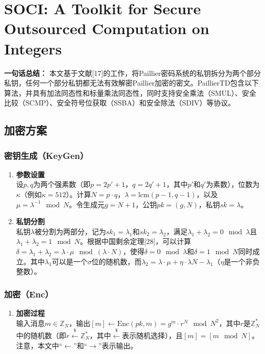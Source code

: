 \section{SOCI: A Toolkit for Secure Outsourced  Computation on Integers}
\textbf{一句话总结：}  
本文基于文献[17]的工作，将Paillier密码系统的私钥拆分为两个部分私钥，任何一个部分私钥都无法有效解密Paillier加密的密文。PaillierTD包含以下算法，并具有加法同态性和标量乘法同态性，同时支持安全乘法（SMUL）、安全比较（SCMP）、安全符号位获取（SSBA）和安全除法（SDIV）等协议。

\subsection{加密方案}
\subsubsection{密钥生成（KeyGen）}
\begin{enumerate}[leftmargin=*, nosep]
    \item \textbf{参数设置}  \\
    设\( p, q \)为两个强素数（即\( p = 2p' + 1 \)，\( q = 2q' + 1 \)，其中\( p' \)和\( q' \)为素数），位数为\( \kappa \)（例如\( \kappa = 512 \)）。计算\( N = p \cdot q \)，\( \lambda = \text{lcm}(p - 1, q - 1) \)，以及\( \mu = \lambda^{-1} \mod N \)。令生成元\( g = N + 1 \)，公钥\( pk = (g, N) \)，私钥\( sk = \lambda \)。
    \item \textbf{私钥分割}  \\
    私钥\( \lambda \)被分割为两部分，记为\( sk_1 = \lambda_1 \)和\( sk_2 = \lambda_2 \)，满足\( \lambda_1 + \lambda_2 = 0 \mod \lambda \)且\( \lambda_1 + \lambda_2 = 1 \mod N \)。根据中国剩余定理[28]，可以计算\( \delta = \lambda_1 + \lambda_2 = \lambda \cdot \mu \mod (\lambda \cdot N) \)，使得\( \delta = 0 \mod \lambda \)和\( \delta = 1 \mod N \)同时成立。其中\( \lambda_1 \)可以是一个\(\sigma\)位的随机数，而\( \lambda_2 = \lambda \cdot \mu + \eta \cdot \lambda N - \lambda_1 \)（\(\eta\)是一个非负整数）。
\end{enumerate}

\subsubsection{加密（Enc）}
\begin{enumerate}[leftmargin=*, nosep]
    \item \textbf{加密过程}  \\
    输入消息\( m \in \mathbb{Z}_N \)，输出\([m] \leftarrow \text{Enc}(pk, m) = g^{m} \cdot r^N \mod N^2\)，其中\( r \)是\( \mathbb{Z}_N^* \)中的随机数（即\( r \overset{\$}{\leftarrow} \mathbb{Z}_N^* \)，其中\( \overset{\$}{\leftarrow} \)表示随机选择），且\([m] = [m \mod N]\)。注意，本文中“\(\leftarrow\)”和“\(\rightarrow\)”表示输出。
\end{enumerate}


